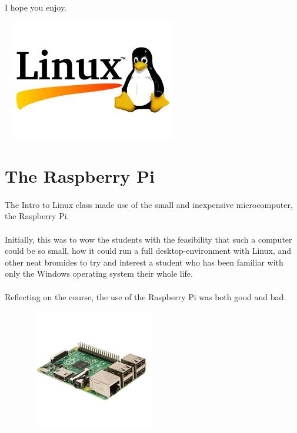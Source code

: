 \documentclass[11pt]{article}
\begin{document}
	\paragraph{} I hope you enjoy.

	\begin{center}
		\graphicspath{ {.} }
		\includegraphics[width=300px,height=200px,keepaspectratio]{tux.jpg}
		\centering
		\vfill
	\end{center}


	\section{The Raspberry Pi}

	\paragraph{} The Intro to Linux class made use of the small and inexpensive microcomputer, the Raspberry Pi.

	\paragraph{} Initially, this was to wow the students with the feasibility that such a computer could be so small, how it could run a full desktop-environment with Linux, and other neat bromides to try and interest a student who has been familiar with only the Windows operating system their whole life.

	\paragraph{} Reflecting on the course, the use of the Raspberry Pi was both good and bad.

	\begin{center}
		\graphicspath{ {.} }
		\includegraphics[width=300px,height=200px,keepaspectratio]{pi.jpg}
		\centering
	\end{center}
\end{document}
